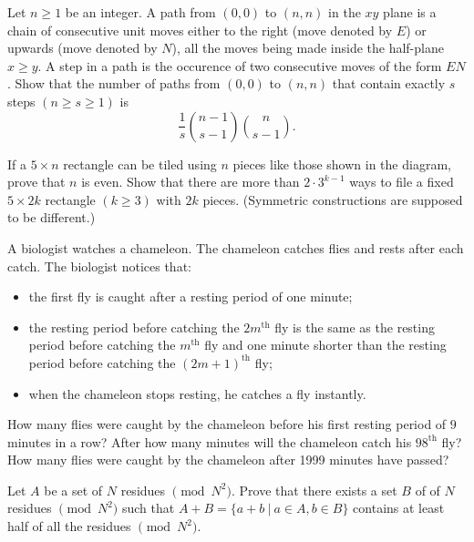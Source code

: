 \item[\textbf{C1.}]Let $n \geq 1$ be an integer. A path from $(0,0)$ to $(n,n)$ in the $xy$ plane is a chain of consecutive unit moves either to the right (move denoted by $E$) or upwards (move denoted by $N$), all the moves being made inside the half-plane $x \geq y$. A step in a path is the occurence of two consecutive moves of the form $EN$. Show that the number of paths from $(0,0)$ to $(n,n)$ that contain exactly $s$ steps $(n \geq s \geq 1)$ is\[\frac{1}{s} \binom{n-1}{s-1} \binom{n}{s-1}.\]

\item[\textbf{C2.}]If a $5 \times n$ rectangle can be tiled using $n$ pieces like those shown in the diagram, prove that $n$ is even. Show that there are more than $2 \cdot 3^{k-1}$ ways to file a fixed $5 \times 2k$ rectangle $(k \geq 3)$ with $2k$ pieces. (Symmetric constructions are supposed to be different.)

\item[\textbf{C3.}]A biologist watches a chameleon. The chameleon catches flies and rests after each catch. The biologist notices that:

\begin{itemize}

\item the first fly is caught after a resting period of one minute;

\item the resting period before catching the $2m^\text{th}$ fly is the same as the resting period before catching the $m^\text{th}$ fly and one minute shorter than the resting period before catching the $(2m+1)^\text{th}$ fly;

\item when the chameleon stops resting, he catches a fly instantly.

\end{itemize}

How many flies were caught by the chameleon before his first resting period of $9$ minutes in a row? After how many minutes will the chameleon catch his $98^\text{th}$ fly? How many flies were caught by the chameleon after 1999 minutes have passed?

\item[\textbf{C4.}]Let $A$ be a set of $N$ residues $\pmod{N^{2}}$. Prove that there exists a set $B$ of of $N$ residues $\pmod{N^{2}}$ such that $A + B = \{a+b\ |\ a \in A, b \in B\}$ contains at least half of all the residues $\pmod{N^{2}}$.


